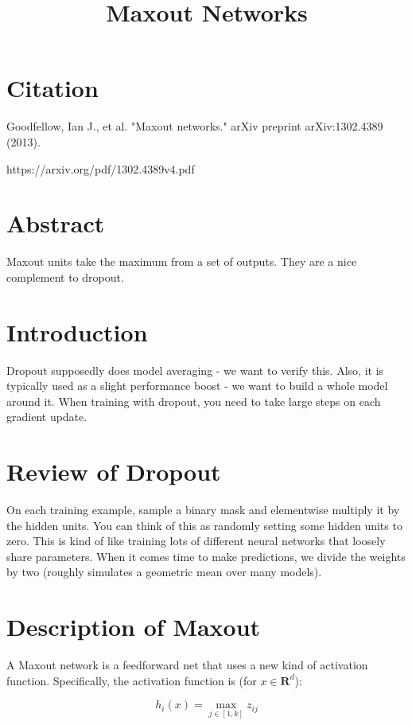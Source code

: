 \documentclass[a4paper]{article}
\title{Maxout Networks}
\date{}
\begin{document}
\maketitle

\section{Citation}

Goodfellow, Ian J., et al. "Maxout networks." arXiv preprint arXiv:1302.4389 (2013).

https://arxiv.org/pdf/1302.4389v4.pdf

\section{Abstract}
Maxout units take the maximum from a set of outputs. They are a nice complement
to dropout.

\section{Introduction}
Dropout supposedly does model averaging - we want to verify this. Also, it is
typically used as a slight performance boost - we want to build a whole model
around it. When training with dropout, you need to take large steps on each
gradient update.

\section{Review of Dropout}
On each training example, sample a binary mask and elementwise multiply it by
the hidden units. You can think of this as randomly setting some hidden units
to zero. This is kind of like training lots of different neural networks that
loosely share parameters. When it comes time to make predictions, we divide
the weights by two (roughly simulates a geometric mean over many models).

\section{Description of Maxout}
A Maxout network is a feedforward net that uses a new kind of activation
function. Specifically, the activation function is (for $x \in \mathbf{R}^d$):

\begin{equation}
  h_i(x) = \max_{j \in [1, k]} z_{ij}
\end{equation}
\end{document}
